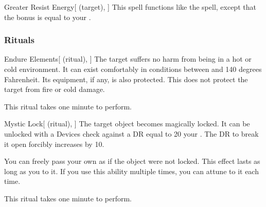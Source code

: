 \lowercase{\hypertarget{spell:Greater Resist Energy}{}}\label{spell:Greater Resist Energy}
\begin{attuneability}[\nth{6}]{\hypertarget{spell:Greater Resist Energy}{Greater Resist Energy}}[ (target), ]
This spell functions like the  spell, except that the bonus is equal to your .
\end{attuneability}
\vspace{0.25em}



\subsubsection{Rituals}


\lowercase{\hypertarget{spell:Endure Elements}{}}\label{spell:Endure Elements}
\begin{attuneability}[\nth{1}]{\hypertarget{spell:Endure Elements}{Endure Elements}}[ (ritual), ]
The target suffers no harm from being in a hot or cold environment.
It can exist comfortably in conditions between  and 140 degrees Fahrenheit.
Its equipment, if any, is also protected.
This does not protect the target from fire or cold damage.

This ritual takes one minute to perform.
\end{attuneability}
\vspace{0.25em}



\lowercase{\hypertarget{spell:Mystic Lock}{}}\label{spell:Mystic Lock}
\begin{attuneability}[\nth{2}]{\hypertarget{spell:Mystic Lock}{Mystic Lock}}[ (ritual), ]
The target object becomes magically locked.
It can be unlocked with a Devices check against a DR equal to 20 \add your .
The DR to break it open forcibly increases by 10.

You can freely pass your own  as if the object were not locked.
This effect lasts as long as you  to it.
If you use this ability multiple times, you can attune to it each time.

This ritual takes one minute to perform.
\end{attuneability}
\vspace{0.25em}



